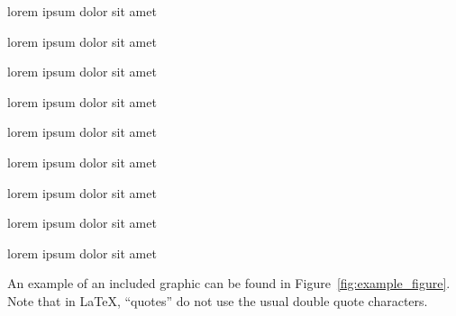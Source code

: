 \begin{lemma} lorem ipsum dolor sit amet \end{lemma}

\begin{corollary} lorem ipsum dolor sit amet \end{corollary}

\begin{observation} lorem ipsum dolor sit amet \end{observation}

\begin{definition} lorem ipsum dolor sit amet \end{definition}

\begin{problem} lorem ipsum dolor sit amet \end{problem}

\begin{assumption} lorem ipsum dolor sit amet \end{assumption}

\begin{example} lorem ipsum dolor sit amet \end{example}

\begin{claim} lorem ipsum dolor sit amet \end{claim}

\begin{remark} lorem ipsum dolor sit amet \end{remark}

 An example of an included graphic can be found in
Figure~\ref{fig:example_figure}. Note that in \LaTeX, ``quotes'' do not use
the usual double quote characters.